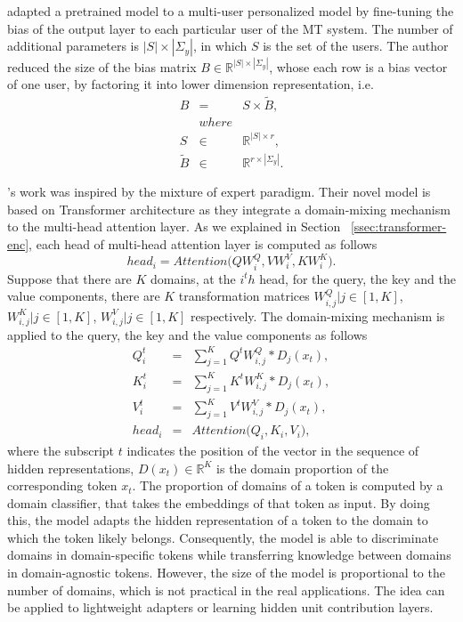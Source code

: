 \citet{Michel18extreme} adapted a pretrained model to a multi-user personalized model by fine-tuning the bias of the output layer to each particular user of the MT system. The number of additional parameters is $|S| \times |\Sigma_y|$, in which $S$ is the set of the users. The author reduced the size of the bias matrix $B \in \mathbb{R}^{|S| \times |\Sigma_y|}$, whose each row is a bias vector of one user, by factoring it into lower dimension representation, i.e.
\begin{equation}
\begin{array}{rcl}
B &=& S \times \tilde{B}, \\
&where& \\
S & \in & \mathbb{R}^{|S| \times r}, \\
\tilde{B} & \in & \mathbb{R}^{r \times |\Sigma_y|}.
\end{array}
\end{equation}

\citet{Jiang20Multi}'s work was inspired by the mixture of expert paradigm. Their novel model is based on Transformer architecture \citep{Vaswani17attention} as they integrate a domain-mixing mechanism to the multi-head attention layer. As we explained in Section ~\ref{ssec:transformer-enc}, each head of multi-head attention layer is computed as follows
\begin{equation}
head_i = Attention \big(QW_i^Q, VW_i^V, KW_i^K \big).
\end{equation}
Suppose that there are $K$ domains, at the $i^th$ head, for the query, the key and the value components, there are $K$ transformation matrices $W_{i,j}^Q | j \in [1,K]$, $W_{i,j}^K | j \in [1,K]$, $W_{i,j}^V | j \in [1,K]$ respectively. The domain-mixing mechanism is applied to the query, the key and the value components as follows
\begin{equation}
\begin{array}{rcl}
Q_i^t &=& \sum_{j=1}^K Q^tW_{i,j}^Q*\mathit{D}_j(x_t),\\
K_i^t &=& \sum_{j=1}^K K^tW_{i,j}^K*\mathit{D}_j(x_t),\\
V_i^t &=& \sum_{j=1}^K V^tW_{i,j}^V*\mathit{D}_j(x_t),\\
head_i &=& Attention \big( Q_i, K_i, V_i\big),
\end{array}
\end{equation}
where the subscript $t$ indicates the position of the vector in the sequence of hidden representations, $\mathit{D}(x_t) \in \mathbb{R}^{K}$ is the domain proportion of the corresponding token $x_t$. The proportion of domains of a token is computed by a domain classifier, that takes the embeddings of that token as input. By doing this, the model adapts the hidden representation of a token to the domain to which the token likely belongs. Consequently, the model is able to discriminate domains in domain-specific tokens while transferring knowledge between domains in domain-agnostic tokens. However, the size of the model is proportional to the number of domains, which is not practical in the real applications. The idea can be applied to lightweight adapters or learning hidden unit contribution layers.

